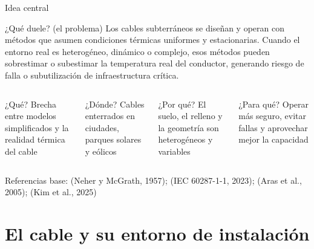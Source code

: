 \documentclass[aspectratio=169]{beamer}
\newcommand{\refcite}[1]{{\footnotesize\color{gray!70!black} #1}}
\begin{document}
\begin{frame}{Idea central}
\justifying

\begin{alertblock}{¿Qué duele? (el problema)}
Los cables subterráneos se diseñan y operan con métodos que asumen condiciones
térmicas uniformes y estacionarias. Cuando el entorno real es heterogéneo,
dinámico o complejo, esos métodos pueden sobrestimar o subestimar la
temperatura real del conductor, generando riesgo de falla o subutilización
de infraestructura crítica.
\end{alertblock}

\vspace{0.5em}
\begin{columns}[T]
\begin{block}{\small¿Qué?}
\tiny Brecha entre modelos simplificados y la realidad térmica del cable
\end{block}
\begin{block}{\small¿Dónde?}
\tiny Cables enterrados en ciudades, parques solares y eólicos
\end{block}
\begin{block}{\small¿Por qué?}
\tiny El suelo, el relleno y la geometría son heterogéneos y variables
\end{block}
\begin{block}{\small¿Para qué?}
\tiny Operar más seguro, evitar fallas y aprovechar mejor la capacidad
\end{block}
\end{columns}

\vspace{0.4em}
\refcite{Referencias base: (Neher y McGrath, 1957); (IEC 60287-1-1, 2023);
(Aras et al., 2005); (Kim et al., 2025)}
\end{frame}

\section{El cable y su entorno de instalación}
\end{document}
